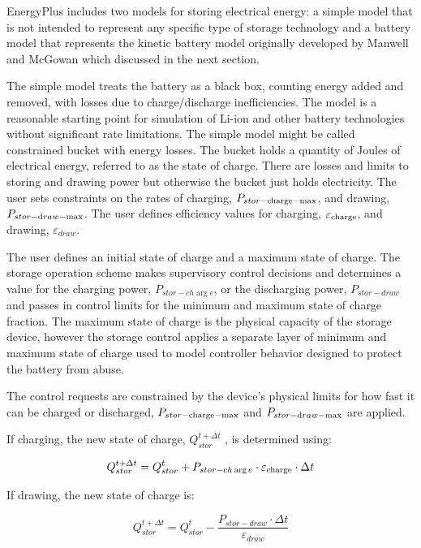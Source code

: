 EnergyPlus includes two models for storing electrical energy: a simple model that is not intended to represent any specific type of storage technology and a battery model that represents the kinetic battery model originally developed by Manwell and McGowan which discussed in the next section.

The simple model treats the battery as a black box, counting energy added and removed, with losses due to charge/discharge inefficiencies. The model is a reasonable starting point for simulation of Li-ion and other battery technologies without significant rate limitations. The simple model might be called constrained bucket with energy losses.  The bucket holds a quantity of Joules of electrical energy, referred to as the state of charge. There are losses and limits to storing and drawing power but otherwise the bucket just holds electricity. The user sets constraints on the rates of charging, ${P_{stor - {\rm{charge - max}}}}$, and drawing, ${P_{stor - {\rm{d}}raw{\rm{ - max}}}}$. The user defines efficiency values for charging, ${\varepsilon_{{\rm{charge}}}}$, and drawing, ${\varepsilon_{draw}}$. 

The user defines an initial state of charge and a maximum state of charge. The storage operation scheme makes supervisory control decisions and determines a value for the charging power, ${P_{stor - ch\arg e}}$, or the discharging power, ${P_{stor - draw}}$ and passes in control limits for the minimum and maximum state of charge fraction.  The maximum state of charge is the physical capacity of the storage device, however the storage control applies a separate layer of minimum and maximum state of charge used to model controller behavior designed to protect the battery from abuse. 

The control requests are constrained by the device's physical limits for how fast it can be charged or discharged, ${P_{stor - {\rm{charge - max}}}}$ and ${P_{stor - {\rm{d}}raw{\rm{ - max}}}}$ are applied.

If charging, the new state of charge, \(Q_{stor}^{t + \Delta t}\) , is determined using:

\begin{equation}
Q_{stor}^{t + \Delta t} = Q_{stor}^t + {P_{stor - ch\arg e}} \cdot {\varepsilon_{{\rm{charge}}}} \cdot \Delta t
\end{equation}

If drawing, the new state of charge is:

\begin{equation}
Q_{stor}^{t + \Delta t} = Q_{stor}^t - \frac{{{P_{stor - draw}} \cdot \Delta t}}{{{\varepsilon_{draw}}}}
\end{equation}

